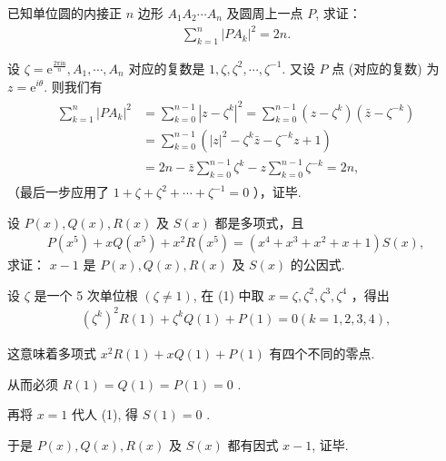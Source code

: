 \begin{example}
	已知单位圆的内接正 $n$ 边形 $A_1 A_2 \cdots A_n$ 及圆周上一点 $P$, 求证：
	\begin{align*}
		\sum_{k=1}^n\left|P A_k\right|^2=2 n .
	\end{align*}
\end{example}

\begin{solution}
	设 $\zeta=\mathrm{e}^{\frac{2 \pi \mathrm{in}}{n}}, A_1, \cdots, A_n$ 对应的复数是 $1, \zeta, \zeta^2, \cdots, \zeta^{-1}$. 又设 $P$ 点 (对应的复数) 为 $z=\mathrm{e}^{i \theta}$. 则我们有
	\begin{align*}
		\begin{aligned}
			\sum_{k=1}^n\left|P A_k\right|^2 & =\sum_{k=0}^{n-1}\left|z-\zeta^k\right|^2=\sum_{k=0}^{n-1}\left(z-\zeta^k\right)\left(\bar{z}-\zeta^{-k}\right) \\
			                                 & =\sum_{k=0}^{n-1}\left(|z|^2-\zeta^k \bar{z}-\zeta^{-k} z+1\right)                                              \\
			                                 & =2 n-\bar{z} \sum_{k=0}^{n-1} \zeta^k-z \sum_{k=0}^{n-1} \zeta^{-k}=2 n,
		\end{aligned}
	\end{align*}
	（最后一步应用了 $1+\zeta+\zeta^2+\cdots+\zeta^{-1}=0$ ），证毕.
\end{solution}

\begin{example}
	设 $P(x), Q(x), R(x)$ 及 $S(x)$ 都是多项式，且
	\begin{align*}
		P\left(x^5\right)+x Q\left(x^5\right)+x^2 R\left(x^5\right)=\left(x^4+x^3+x^2+x+1\right) S(x),
	\end{align*}
	求证： $x-1$ 是 $P(x), Q(x), R(x)$ 及 $S(x)$ 的公因式.
\end{example}
\begin{solution}
	设 $\zeta$ 是一个 5 次单位根 $(\zeta \neq 1)$, 在 (1) 中取 $x=\zeta, \zeta^2, \zeta^3, \zeta^4$ ，得出
	\begin{align*}
		\left(\zeta^k\right)^2 R(1)+\zeta^k Q(1)+P(1)=0(k=1,2,3,4),
	\end{align*}

	这意味着多项式 $x^2 R(1)+x Q(1)+P(1)$ 有四个不同的零点.

	从而必须 $R(1)=Q(1)=P(1)=0$ .

	再将 $x=1$ 代人 (1), 得 $S(1)=0$ .

	于是 $P(x), Q(x), R(x)$ 及 $S(x)$ 都有因式 $x-1$, 证毕.
\end{solution}

